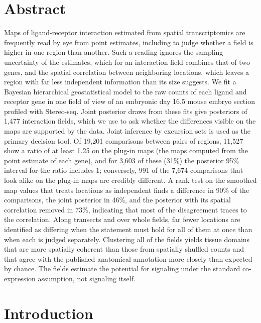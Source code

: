 \documentclass[10pt,letterpaper]{article}
\begin{document}
\section*{Abstract}
Maps of ligand-receptor interaction estimated from spatial transcriptomics are frequently read by eye from point estimates, including to judge whether a field is higher in one region than another. Such a reading ignores the sampling uncertainty of the estimates, which for an interaction field combines that of two genes, and the spatial correlation between neighboring locations, which leaves a region with far less independent information than its size suggests. We fit a Bayesian hierarchical geostatistical model to the raw counts of each ligand and receptor gene in one field of view of an embryonic day 16.5 mouse embryo section profiled with Stereo-seq. Joint posterior draws from these fits give posteriors of 1,477 interaction fields, which we use to ask whether the differences visible on the maps are supported by the data. Joint inference by excursion sets is used as the primary decision tool. Of 19,201 comparisons between pairs of regions, 11,527 show a ratio of at least 1.25 on the plug-in maps (the maps computed from the point estimate of each gene), and for 3,603 of these (31\%) the posterior 95\% interval for the ratio includes 1; conversely, 991 of the 7,674 comparisons that look alike on the plug-in maps are credibly different. A rank test on the smoothed map values that treats locations as independent finds a difference in 90\% of the comparisons, the joint posterior in 46\%, and the posterior with its spatial correlation removed in 73\%, indicating that most of the disagreement traces to the correlation. Along transects and over whole fields, far fewer locations are identified as differing when the statement must hold for all of them at once than when each is judged separately. Clustering all of the fields yields tissue domains that are more spatially coherent than those from spatially shuffled counts and that agree with the published anatomical annotation more closely than expected by chance. The fields estimate the potential for signaling under the standard co-expression assumption, not signaling itself.

\linenumbers

\section*{Introduction}
\end{document}
